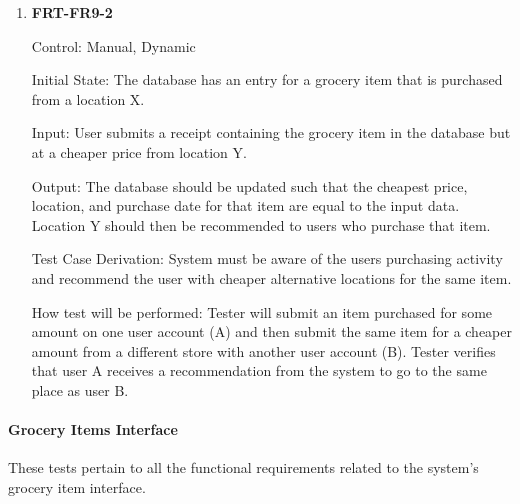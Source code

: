 \documentclass[12pt, titlepage]{article}
\begin{document}
\begin{enumerate}
\item{\textbf{FRT-FR9-2}}

Control: Manual, Dynamic
          
Initial State: The database has an entry for a grocery item that is purchased from a location X.

Input: User submits a receipt containing the grocery item in the database but at a cheaper price from location Y.
          
Output: The database should be updated such that the cheapest price, location, and purchase date for that item are equal to the input data. Location Y should then be recommended to users who purchase that item.

Test Case Derivation: System must be aware of the users purchasing activity and recommend the user with cheaper alternative locations for the same item.
          
How test will be performed: Tester will submit an item purchased for some amount on one user account (A) and then submit the same item for a cheaper amount from a different store with another user account (B). Tester verifies that user A receives a recommendation from the system to go to the same place as user B.

\end{enumerate}

\paragraph{Grocery Items Interface}

These tests pertain to all the functional requirements related to the system's grocery item interface.
\end{document}
